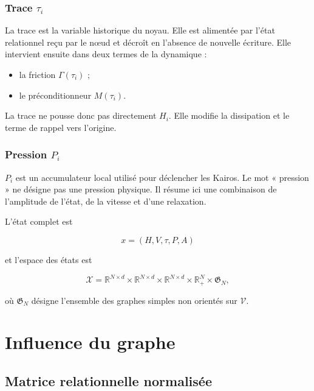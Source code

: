 \subsection{Trace \texorpdfstring{\(\tau_i\)}{tau i}}\label{t1-trace-tau_i}

La trace est la variable historique du noyau. Elle est alimentée par l'état relationnel reçu par le nœud et décroît en l'absence de nouvelle écriture. Elle intervient ensuite dans deux termes de la dynamique :

\begin{itemize}
\tightlist
\item
  la friction \(\Gamma(\tau_i)\) ;
\item
  le préconditionneur \(M(\tau_i)\).
\end{itemize}

La trace ne pousse donc pas directement \(H_i\). Elle modifie la dissipation et le terme de rappel vers l’origine.

\subsection{Pression \texorpdfstring{\(P_i\)}{Pi}}\label{t1-pression-p_i}

\(P_i\) est un accumulateur local utilisé pour déclencher les Kairos. Le mot « pression » ne désigne pas une pression physique. Il résume ici une combinaison de l'amplitude de l'état, de la vitesse et d'une relaxation.

\begin{encadre}
L'état complet est

\[
x=(H,V,\tau,P,A)
\]

et l'espace des états est

\[
\mathcal X
=
\mathbb R^{N\times d}
\times
\mathbb R^{N\times d}
\times
\mathbb R^{N\times d}
\times
\mathbb R_+^N
\times
\mathfrak G_N,
\]

où \(\mathfrak G_N\) désigne l'ensemble des graphes simples non orientés
sur \(\mathcal V\).
\end{encadre}

\chapter{Influence du graphe}\label{t1-influence-du-graphe}

\section{Matrice relationnelle
normalisée}\label{t1-matrice-relationnelle-normalisee}

